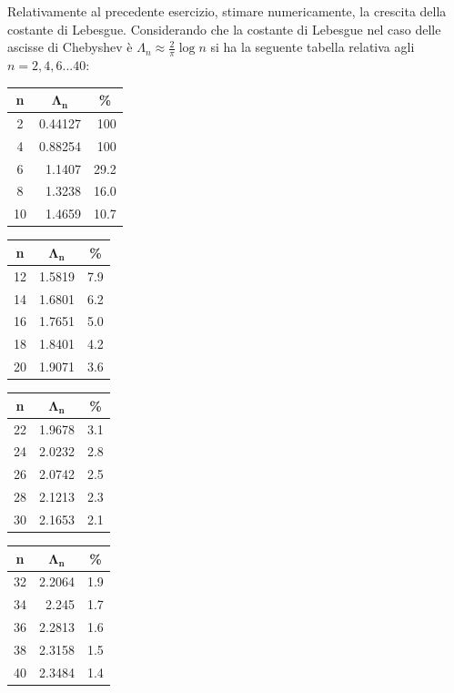 Relativamente al precedente esercizio, stimare numericamente, la crescita della costante di Lebesgue.
\PP
Considerando che la costante di Lebesgue nel caso delle ascisse di Chebyshev è $\Lambda_n \approx \frac{2}{\pi}\log{n} $ si ha la seguente tabella relativa agli $n=2,4,6 ... 40$:\\
\begin{tabular}{ | c | r | r }
\textbf{n} & \multicolumn{1}{c}{$\mathbf{\Lambda_n}$} & \multicolumn{1}{c}{\textbf{\%}}\\
\hline
      2   &  0.44127  &     100  \\
      4   &  0.88254  &     100  \\
      6   &   1.1407  &  29.2  \\
      8   &   1.3238  &  16.0  \\
     10   &   1.4659  &  10.7  \\
\end{tabular}
\begin{tabular}{ | c | r | r }
\textbf{n} & \multicolumn{1}{c}{$\mathbf{\Lambda_n}$} & \multicolumn{1}{c}{\textbf{\%}}\\
\hline
     12   &   1.5819  &  7.9  \\
     14   &   1.6801  &  6.2  \\
     16   &   1.7651  &  5.0  \\
     18   &   1.8401  &  4.2  \\
     20   &   1.9071  &  3.6  \\
\end{tabular}
\begin{tabular}{ | c | r | r }
\textbf{n} & \multicolumn{1}{c}{$\mathbf{\Lambda_n}$} & \multicolumn{1}{c}{\textbf{\%}}\\
\hline
     22   &   1.9678  &  3.1  \\
     24   &   2.0232  &   2.8  \\
     26   &   2.0742  &  2.5  \\
     28   &   2.1213  &  2.3  \\
     30   &   2.1653  &  2.1  \\
\end{tabular}
\begin{tabular}{ | c | r | r }
\textbf{n} & \multicolumn{1}{c}{$\mathbf{\Lambda_n}$} & \multicolumn{1}{c}{\textbf{\%}}\\
\hline
     32   &   2.2064  &  1.9  \\
     34   &    2.245  &  1.7  \\
     36   &   2.2813  &  1.6  \\
     38   &   2.3158  &  1.5  \\
     40   &   2.3484  &  1.4  \\
\end{tabular}



